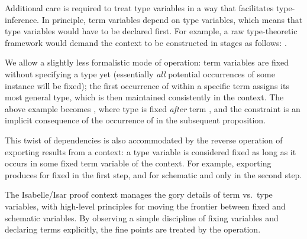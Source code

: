 \begin{isabellebody}
\begin{isamarkuptext}
  \medskip Additional care is required to treat type variables in a
  way that facilitates type-inference.  In principle, term variables
  depend on type variables, which means that type variables would have
  to be declared first.  For example, a raw type-theoretic framework
  would demand the context to be constructed in stages as follows:
  .

  We allow a slightly less formalistic mode of operation: term
  variables  are fixed without specifying a type yet
  (essentially \emph{all} potential occurrences of some instance
   will be fixed); the first occurrence of  within a specific term assigns its most general type, which is
  then maintained consistently in the context.  The above example
  becomes , where type
  \isa{{\isasymalpha}} is fixed \emph{after} term , and the
  constraint  is an implicit consequence of the
  occurrence of  in the subsequent proposition.

  This twist of dependencies is also accommodated by the reverse
  operation of exporting results from a context: a type variable
  \isa{{\isasymalpha}} is considered fixed as long as it occurs in some fixed
  term variable of the context.  For example, exporting  produces  for fixed \isa{{\isasymalpha}} in the first step,
  and  for
  schematic  and \isa{{\isacharquery}{\isasymalpha}} only in the second step.

  \medskip The Isabelle/Isar proof context manages the gory details of
  term vs.\ type variables, with high-level principles for moving the
  frontier between fixed and schematic variables.  By observing a
  simple discipline of fixing variables and declaring terms
  explicitly, the fine points are treated by the 
  operation.


\end{isamarkuptext}
\end{isabellebody}
